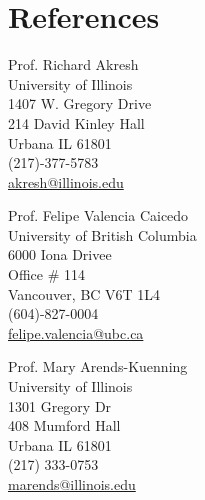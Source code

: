 \documentclass[letterpaper,11pt]{article}
\begin{document}
\section*{References}
\begin{multicols}{3}
    \noindent
    Prof. Richard Akresh \\
    University of Illinois \\
    1407 W. Gregory Drive \\
    214 David Kinley Hall \\
    Urbana IL 61801 \\
    (217)-377-5783 \\
    \href{mailto:akresh@illinois.edu}{akresh@illinois.edu}
    \columnbreak

    \noindent
    Prof. Felipe Valencia Caicedo \\
    University of British Columbia \\
    6000 Iona Drivee \\
    Office \# 114 \\
    Vancouver, BC V6T 1L4  \\
    (604)-827-0004 \\
    \href{mailto:felipe.valencia@ubc.ca}{felipe.valencia@ubc.ca}
    \columnbreak

    \noindent
    Prof. Mary Arends-Kuenning \\
    University of Illinois \\
    1301 Gregory Dr \\
    408 Mumford Hall \\
    Urbana IL 61801 \\
    (217) 333-0753 \\
    \href{mailto:marends@illinois.edu}{marends@illinois.edu}
\end{multicols}

\clearpage
\end{document}
